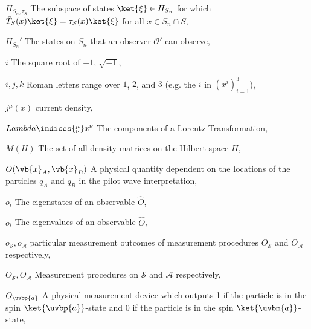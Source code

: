 \begin{thenomenclature}
  \item [{$H_{S_n,\tau_S}\label{HStau}$}]\begingroup The subspace of states $\ket{\xi}\in  H_{S_n}$ for which  $\hat{T}_S(x)\ket{\xi}=\tau_S(x)\ket{\xi}$  for all $x\in S_n\cap S$, \nomrefpage{}
  \item [{$H_{S_n}'$}]\begingroup The states on $S_n$ that an observer $\mathcal{O}'$ can observe, \nomrefpage{}
  \item [{$i$}]\begingroup The square root of $-1$, $\sqrt {-1}$, \nomrefpage {}
  \item [{$i,j,k$}]\begingroup Roman letters range over $1$, $2$, and $3$ (e.g. the $i$ in $(x^i)_{i=1}^3$), \nomrefpage{}
  \item [{$j^\mu (x)$}]\begingroup current density, \nomrefpage {}
  \item [{$Lambda\indices{^\mu_\nu}x^\nu$}]\begingroup The components of a Lorentz Transformation, \nomrefpage{}
  \item [{$M(H)$}]\begingroup The set of all density matrices on the Hilbert space $H$, \nomrefpage{}
  \item [{$O(\vb{x}_A, \vb{x}_B)$}]\begingroup A physical quantity dependent on the locations of the particles $q_A$ and $q_B$ in the pilot wave interpretation, \nomrefpage{}
  \item [{$o_i$}]\begingroup The eigenstates of an observable $\hat{O}$, \nomrefpage{}
  \item [{$o_i$}]\begingroup The eigenvalues of an observable $\hat{O}$, \nomrefpage{}
  \item [{$o_{\mathcal{S}}, o_{\mathcal{A}}$}]\begingroup particular measurement outcomes of measurement procedures $O_{\mathcal{S}}$ and $O_{\mathcal{A}}$ respectively, \nomrefpage{}
  \item [{$O_{\mathcal{S}}, O_{\mathcal{A}}$ }]\begingroup Measurement procedures on $\mathcal{S}$ and $\mathcal{A}$ respectively, \nomrefpage{}
  \item [{$O_{\uvbp{a}}$}]\begingroup A physical measurement device which outputs 1 if the particle is in the spin $\ket{\uvbp{a}}$-state and 0 if the particle is in the spin $\ket{\uvbm{a}}$-state, \nomrefpage{}

\end{thenomenclature}

